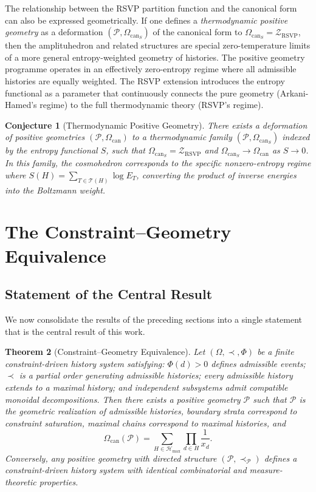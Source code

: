 \documentclass[12pt, oneside]{amsart}
\theoremstyle{plain}
\newtheorem{theorem}{Theorem}[section]
\newtheorem{conjecture}[theorem]{Conjecture}
\theoremstyle{definition}
\theoremstyle{remark}
\newcommand{\Phif}{\Phi}
\newcommand{\Sf}{S}
\newcommand{\OmKS}{\Omega}
\newcommand{\CF}{\Omega_{\mathrm{can}}}
\newcommand{\ZRSVP}{\mathcal{Z}_{\mathrm{RSVP}}}
\newcommand{\Hmax}{\mathcal{H}_{\max}}
\begin{document}
The relationship between the RSVP partition function and the canonical form can also be expressed geometrically. If one defines a \emph{thermodynamic positive geometry} as a deformation $(\mathcal{P}, \CF_{\Sf})$ of the canonical form to $\CF_{\Sf} = \ZRSVP$, then the amplituhedron and related structures are special zero-temperature limits of a more general entropy-weighted geometry of histories. The positive geometry programme operates in an effectively zero-entropy regime where all admissible histories are equally weighted. The RSVP extension introduces the entropy functional as a parameter that continuously connects the pure geometry (Arkani-Hamed's regime) to the full thermodynamic theory (RSVP's regime).

\begin{conjecture}[Thermodynamic Positive Geometry]
There exists a deformation of positive geometries $(\mathcal{P}, \CF)$ to a thermodynamic family $(\mathcal{P}, \CF_{\Sf})$ indexed by the entropy functional $\Sf$, such that $\CF_{\Sf} = \ZRSVP$ and $\CF_{\Sf} \to \CF$ as $\Sf \to 0$. In this family, the cosmohedron corresponds to the specific nonzero-entropy regime where $\Sf(H) = \sum_{T \in \mathcal{T}(H)} \log E_T$, converting the product of inverse energies into the Boltzmann weight.
\end{conjecture}

\section{The Constraint--Geometry Equivalence}
\label{sec:master}

\subsection{Statement of the Central Result}

We now consolidate the results of the preceding sections into a single statement that is the central result of this work.

\begin{theorem}[Constraint--Geometry Equivalence]
\label{thm:master}
Let $(\OmKS, \prec, \Phif)$ be a finite constraint-driven history system satisfying: $\Phif(d) > 0$ defines admissible events; $\prec$ is a partial order generating admissible histories; every admissible history extends to a maximal history; and independent subsystems admit compatible monoidal decompositions. Then there exists a positive geometry $\mathcal{P}$ such that $\mathcal{P}$ is the geometric realization of admissible histories, boundary strata correspond to constraint saturation, maximal chains correspond to maximal histories, and
\[
  \CF(\mathcal{P}) = \sum_{H \in \Hmax} \prod_{d \in H} \frac{1}{x_d}.
\]
Conversely, any positive geometry with directed structure $(\mathcal{P}, \prec_{\mathcal{P}})$ defines a constraint-driven history system with identical combinatorial and measure-theoretic properties.
\end{theorem}
\end{document}
